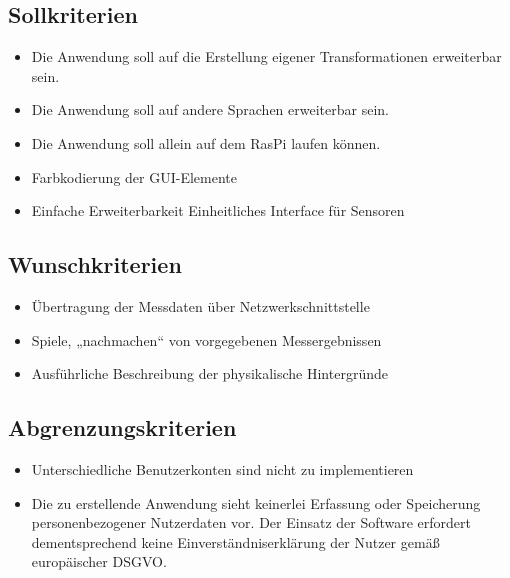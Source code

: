 \documentclass[parskip=full]{scrartcl}
\begin{document}
\subsection{Sollkriterien}

\begin{itemize}

\item Die Anwendung soll auf die Erstellung eigener Transformationen erweiterbar sein.
\item Die Anwendung soll auf andere Sprachen erweiterbar sein.
\item Die Anwendung soll allein auf dem \gls{RasPi} laufen können.
\item Farbkodierung der GUI-Elemente
\item Einfache Erweiterbarkeit
\subitem Einheitliches Interface für Sensoren


 \end{itemize}

\subsection{Wunschkriterien}

\begin{itemize}

\item Übertragung der Messdaten über Netzwerkschnittstelle
\item Spiele, „nachmachen“ von vorgegebenen Messergebnissen
\item Ausführliche Beschreibung der physikalische Hintergründe

 \end{itemize}

\subsection{Abgrenzungskriterien}

\begin{itemize}

\item Unterschiedliche Benutzerkonten sind nicht zu implementieren

\item Die zu erstellende Anwendung sieht keinerlei Erfassung oder Speicherung personenbezogener Nutzerdaten vor. Der Einsatz der Software erfordert dementsprechend keine Einverständniserklärung der Nutzer gemäß europäischer \gls{DSGVO}.

 \end{itemize}
\end{document}
